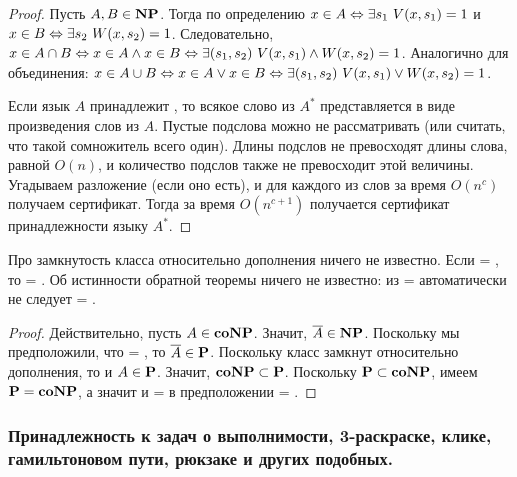 \begin{proof}
Пусть $A, B \in \textbf{NP}$. Тогда по определению \np $x \in A \Leftrightarrow \exists s_1\ V(x, s_1) = 1$ и $x \in B \Leftrightarrow \exists s_2\ W(x, s_2) = 1$. 
Следовательно,
$x \in A \cap B \Leftrightarrow x \in A \wedge x \in B \Leftrightarrow \exists (s_1, s_2) \ V(x, s_1) \wedge W(x, s_2) = 1$.
Аналогично для объединения:
$x \in A \cup B \Leftrightarrow x \in A \lor x \in B \Leftrightarrow \exists (s_1, s_2) \ V(x, s_1) \lor W(x, s_2) = 1$.

Если язык $A$ принадлежит \np, то всякое слово из $A^*$ представляется в виде произведения слов из $A$. Пустые подслова можно не рассматривать (или считать, что такой сомножитель всего один). Длины подслов не превосходят длины слова, равной $O(n)$, и количество подслов также не превосходит этой величины. Угадываем разложение (если оно есть), и для каждого из слов за время $O(n^c)$ получаем сертификат. Тогда за время $O(n^{c+1})$ получается сертификат принадлежности языку $A^*$.
\end{proof}

\begin{note}
Про замкнутость класса \np относительно дополнения ничего не известно.
Если \p = \np, то \np = \conp.
Об истинности обратной теоремы ничего не известно: из \np = \conp автоматически не следует \p = \np.
\end{note}

\begin{proof}
Действительно, пусть $A \in \textbf{coNP}$. Значит, $\overline{A} \in \textbf{NP}$. Поскольку мы предположили, что \p = \np, то $\overline{A} \in \textbf{P}$. Поскольку класс \p замкнут относительно дополнения, то и $A \in \textbf{P}$. Значит, $\textbf{coNP} \subset \textbf{P}$. Поскольку $\textbf{P} \subset \textbf{coNP}$, имеем $\textbf{P} = \textbf{coNP}$, а значит и \np = \conp в предположении \p = \np.
\end{proof}

\subsubsection{Принадлежность к \np задач о выполнимости, 3-раскраске, клике, гамильтоновом пути, рюкзаке и других подобных.}

